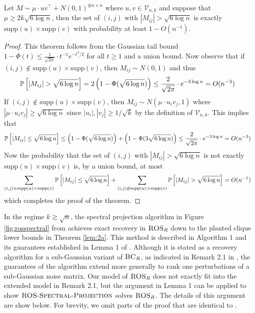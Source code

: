 \begin{theorem}
Let $M \sim \mu \cdot uv^\top + N(0, 1)^{\otimes n \times n}$ where $u, v \in \mathcal{V}_{n, k}$ and suppose that $\mu \ge 2k\sqrt{6\log n}$, then the set of $(i, j)$ with $|M_{ij}| > \sqrt{6\log n}$ is exactly $\text{supp}(u) \times \text{supp}(v)$ with probability at least $1 - O(n^{-1})$. 
\end{theorem}

\begin{proof}
This theorem follows from the Gaussian tail bound $1 - \Phi(t) \le \frac{1}{\sqrt{2\pi}} \cdot t^{-1} e^{-t^2/2}$ for all $t \ge 1$ and a union bound. Now observe that if $(i, j) \not \in \text{supp}(u) \times \text{supp}(v)$, then $M_{ij} \sim N(0, 1)$ and thus
$$\mathbb{P}\left[ |M_{ij}| > \sqrt{6\log n} \right] = 2\left(1 - \Phi(\sqrt{6\log n})\right) \le \frac{2}{\sqrt{2\pi}} \cdot e^{-3\log n} = O(n^{-3})$$
If $(i, j) \not \in \text{supp}(u) \times \text{supp}(v)$, then $M_{ij} \sim N(\mu \cdot u_i v_j, 1)$ where $|\mu \cdot u_i v_j| \ge \sqrt{6 \log n}$ since $|u_i|, |v_j| \ge 1/\sqrt{k}$ by the definition of $\mathcal{V}_{n, k}$. This implies that
$$\mathbb{P}\left[ |M_{ij}| \le \sqrt{6\log n} \right] \le \left(1 - \Phi(\sqrt{6\log n})\right) + \left(1 - \Phi(3\sqrt{6\log n})\right) \le \frac{2}{\sqrt{2\pi}} \cdot e^{-3\log n} = O(n^{-3})$$
Now the probability that the set of $(i, j)$ with $|M_{ij}| > \sqrt{6\log n}$ is not exactly $\text{supp}(u) \times \text{supp}(v)$ is, by a union bound, at most
$$\sum_{(i, j) \in \text{supp}(u) \times \text{supp}(v)} \mathbb{P}\left[ |M_{ij}| \le \sqrt{6\log n} \right] + \sum_{(i, j) \not\in \text{supp}(u) \times \text{supp}(v)} \mathbb{P}\left[ |M_{ij}| > \sqrt{6\log n} \right] = O(n^{-1})$$
which completes the proof of the theorem.
\end{proof}

In the regime $k \gtrsim \sqrt{n}$, the spectral projection algorithm in Figure \ref{fig:rosspectral} from \cite{cai2015computational} achieves exact recovery in $\textsc{ROS}_R$ down to the planted clique lower bounds in Theorem \ref{lem:2a}. This method is described in Algorithm 1 and its guarantees established in Lemma 1 of \cite{cai2015computational}. Although it is stated as a recovery algorithm for a sub-Gaussian variant of $\textsc{BC}_R$, as indicated in Remark 2.1 in \cite{cai2015computational}, the guarantees of the algorithm extend more generally to rank one perturbations of a sub-Gaussian noise matrix. Our model of $\textsc{ROS}_R$ does not exactly fit into the extended model in Remark 2.1, but the argument in Lemma 1 can be applied to show $\textsc{ROS-Spectral-Projection}$ solves $\textsc{ROS}_R$. The details of this argument are show below. For brevity, we omit parts of the proof that are identical to \cite{cai2015computational}.

